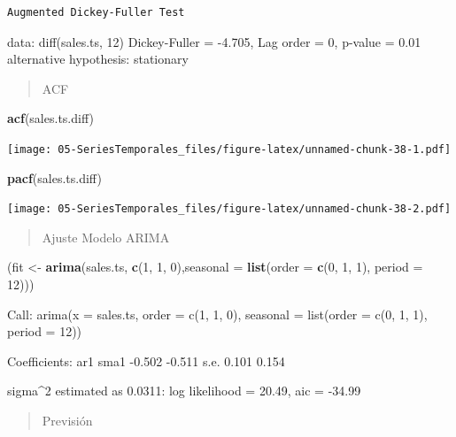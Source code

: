 \documentclass[]{book}
\newenvironment{Shaded}{\begin{snugshade}}{\end{snugshade}}
\newcommand{\DataTypeTok}[1]{\textcolor[rgb]{0.13,0.29,0.53}{#1}}
\newcommand{\DecValTok}[1]{\textcolor[rgb]{0.00,0.00,0.81}{#1}}
\newcommand{\KeywordTok}[1]{\textcolor[rgb]{0.13,0.29,0.53}{\textbf{#1}}}
\newcommand{\NormalTok}[1]{#1}
\newcommand{\StringTok}[1]{\textcolor[rgb]{0.31,0.60,0.02}{#1}}
\begin{document}
\begin{verbatim}
Augmented Dickey-Fuller Test
\end{verbatim}

data: diff(sales.ts, 12)
Dickey-Fuller = -4.705, Lag order = 0, p-value = 0.01
alternative hypothesis: stationary

\begin{quote}
ACF
\end{quote}

\begin{Shaded}
\begin{Highlighting}[]
\KeywordTok{acf}\NormalTok{(sales.ts.diff)}
\end{Highlighting}
\end{Shaded}

\texttt{[image: 05-SeriesTemporales\_files/figure-latex/unnamed-chunk-38-1.pdf]}

\begin{Shaded}
\begin{Highlighting}[]
\KeywordTok{pacf}\NormalTok{(sales.ts.diff)}
\end{Highlighting}
\end{Shaded}

\texttt{[image: 05-SeriesTemporales\_files/figure-latex/unnamed-chunk-38-2.pdf]}

\begin{quote}
Ajuste Modelo ARIMA
\end{quote}

\begin{Shaded}
\begin{Highlighting}[]
\NormalTok{(fit <-}\StringTok{ }\KeywordTok{arima}\NormalTok{(sales.ts, }\KeywordTok{c}\NormalTok{(}\DecValTok{1}\NormalTok{, }\DecValTok{1}\NormalTok{, }\DecValTok{0}\NormalTok{),}\DataTypeTok{seasonal =} \KeywordTok{list}\NormalTok{(}\DataTypeTok{order =} \KeywordTok{c}\NormalTok{(}\DecValTok{0}\NormalTok{, }\DecValTok{1}\NormalTok{, }\DecValTok{1}\NormalTok{), }\DataTypeTok{period =} \DecValTok{12}\NormalTok{)))}
\end{Highlighting}
\end{Shaded}

Call:
arima(x = sales.ts, order = c(1, 1, 0), seasonal = list(order = c(0, 1, 1),
period = 12))

Coefficients:
ar1 sma1
-0.502 -0.511
s.e. 0.101 0.154

sigma\^{}2 estimated as 0.0311: log likelihood = 20.49, aic = -34.99

\begin{quote}
Previsión
\end{quote}
\end{document}
